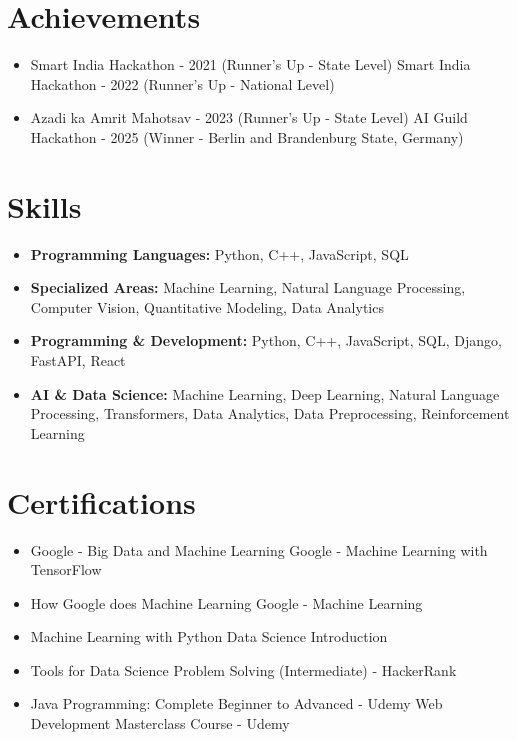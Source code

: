 \documentclass[a4paper,10pt]{article}
\begin{document}
\section*{Achievements}
\begin{itemize}
\item Smart India Hackathon - 2021 (Runner's Up - State Level) \hfill Smart India Hackathon - 2022 (Runner's Up - National Level)
\item Azadi ka Amrit Mahotsav - 2023 (Runner's Up - State Level) \hfill AI Guild Hackathon - 2025 (Winner - Berlin and Brandenburg State, Germany)
\end{itemize}

\section*{Skills}
\begin{itemize}
  \item \textbf{Programming Languages:} Python, C++, JavaScript, SQL
  \item \textbf{Specialized Areas:} Machine Learning, Natural Language Processing, Computer Vision, Quantitative Modeling, Data Analytics
  \item \textbf{Programming \& Development:} Python, C++, JavaScript, SQL, Django, FastAPI, React
  \item \textbf{AI \& Data Science:} Machine Learning, Deep Learning, Natural Language Processing, Transformers, Data Analytics, Data Preprocessing, Reinforcement Learning
\end{itemize}

\section*{Certifications}
\begin{itemize}
\item Google - Big Data and Machine Learning \hfill Google - Machine Learning with TensorFlow
\item How Google does Machine Learning \hfill Google - Machine Learning
\item Machine Learning with Python \hfill Data Science Introduction
\item Tools for Data Science \hfill Problem Solving (Intermediate) - HackerRank
\item Java Programming: Complete Beginner to Advanced - Udemy \hfill Web Development Masterclass Course - Udemy
\end{itemize}
\end{document}
